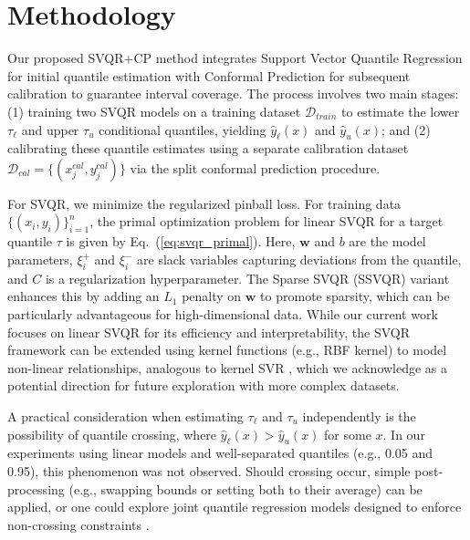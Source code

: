 \documentclass{article}
\begin{document}
\section{Methodology}
\label{sec:methodology}
Our proposed SVQR+CP method integrates Support Vector Quantile Regression for initial quantile estimation with Conformal Prediction for subsequent calibration to guarantee interval coverage. The process involves two main stages: (1) training two SVQR models on a training dataset $\mathcal{D}_{train}$ to estimate the lower $\tau_{\ell}$ and upper $\tau_u$ conditional quantiles, yielding $\hat{y}_{\ell}(x)$ and $\hat{y}_{u}(x)$; and (2) calibrating these quantile estimates using a separate calibration dataset $\mathcal{D}_{cal} = \{(x_j^{cal}, y_j^{cal})\}$ via the split conformal prediction procedure.

For SVQR, we minimize the regularized pinball loss. For training data $\{(x_i, y_i)\}_{i=1}^n$, the primal optimization problem for linear SVQR for a target quantile $\tau$ is given by Eq.~(\ref{eq:svqr_primal}).
Here, $\mathbf{w}$ and $b$ are the model parameters, $\xi_i^+$ and $\xi_i^-$ are slack variables capturing deviations from the quantile, and $C$ is a regularization hyperparameter. The Sparse SVQR (SSVQR) variant enhances this by adding an $L_1$ penalty on $\mathbf{w}$ to promote sparsity, which can be particularly advantageous for high-dimensional data. While our current work focuses on linear SVQR for its efficiency and interpretability, the SVQR framework can be extended using kernel functions (e.g., RBF kernel) to model non-linear relationships, analogous to kernel SVR \citep{Takeuchi2006NonparametricQE}, which we acknowledge as a potential direction for future exploration with more complex datasets.

A practical consideration when estimating $\tau_\ell$ and $\tau_u$ independently is the possibility of quantile crossing, where $\hat{y}_\ell(x) > \hat{y}_u(x)$ for some $x$. In our experiments using linear models and well-separated quantiles (e.g., 0.05 and 0.95), this phenomenon was not observed. Should crossing occur, simple post-processing (e.g., swapping bounds or setting both to their average) can be applied, or one could explore joint quantile regression models designed to enforce non-crossing constraints \citep{Sangnier2016JointQR, Bondell2010NoncrossingQR}.
\end{document}
